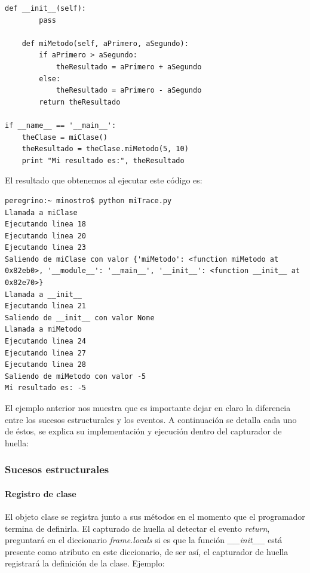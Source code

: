 \documentclass[12pt,legalpaper]{report}
\begin{document}
\begin{itemize}
\begin{singlespace}
\begin{lstlisting}[style=Python]
    def __init__(self):
        pass
    
    def miMetodo(self, aPrimero, aSegundo):
        if aPrimero > aSegundo:
            theResultado = aPrimero + aSegundo
        else:
            theResultado = aPrimero - aSegundo
        return theResultado

if __name__ == '__main__':
    theClase = miClase()
    theResultado = theClase.miMetodo(5, 10)
    print "Mi resultado es:", theResultado
\end{lstlisting}
\end{singlespace}

El resultado que obtenemos al ejecutar este código es:
\begin{singlespace}
\begin{lstlisting}[style=consola, numbers=none]
peregrino:~ minostro$ python miTrace.py
Llamada a miClase
Ejecutando linea 18
Ejecutando linea 20
Ejecutando linea 23
Saliendo de miClase con valor {'miMetodo': <function miMetodo at 0x82eb0>, '__module__': '__main__', '__init__': <function __init__ at 0x82e70>}
Llamada a __init__
Ejecutando linea 21
Saliendo de __init__ con valor None
Llamada a miMetodo
Ejecutando linea 24
Ejecutando linea 27
Ejecutando linea 28
Saliendo de miMetodo con valor -5
Mi resultado es: -5
\end{lstlisting}
\end{singlespace}
\end{itemize}

El ejemplo anterior nos muestra que es importante dejar en claro la diferencia entre los sucesos estructurales y los eventos.  A continuación se detalla cada uno de éstos, se explica su implementación y ejecución dentro del capturador de huella:

			\subsubsection{Sucesos estructurales}
			
				\paragraph{Registro de clase \label{registroClase}}

El objeto clase se registra junto a sus métodos en el momento que el programador termina de definirla.  El capturado de huella al detectar el evento \textit{return}, preguntará en el diccionario \textit{frame.locals} si es que la función \textit{\_\_init\_\_} está presente como atributo en este diccionario, de ser así, el capturador de huella registrará la definición de la clase.  Ejemplo:
\end{document}
